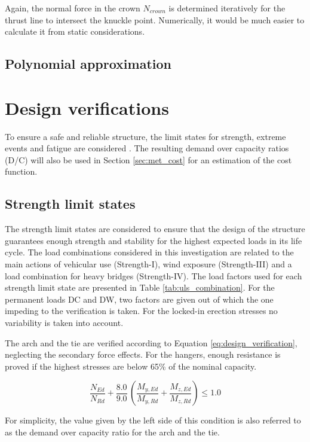 Again, the normal force in the crown $N_{crown}$ is determined iteratively for the thrust line to intersect the knuckle point. Numerically, it would be much easier to calculate it from static considerations.

\subsection{Polynomial approximation}

\newpage
\section{Design verifications} \label{sec:met_ver}
To ensure a safe and reliable structure, the limit states for strength, extreme events and fatigue are considered \cite{AASHTO}.  The resulting demand over capacity ratios (D/C) will also be used in Section \ref{sec:met_cost} for an estimation of the cost function.

\subsection{Strength limit states}
The strength limit states are considered to ensure that the design of the structure guarantees enough strength and stability for the highest expected loads in its life cycle. The load combinations considered in this investigation are related to the main actions of vehicular use (Strength-I), wind exposure (Strength-III) and a load combination for heavy bridges (Strength-IV). The load factors used for each strength limit state are presented in Table \ref{tab:uls_combination}. For the permanent loads DC and DW, two factors are given out of which the one impeding to the verification is taken. For the locked-in erection stresses no variability is taken into account.



The arch and the tie are verified according to Equation \eqref{eq:design_verification}, neglecting the secondary force effects. For the hangers, enough resistance is proved if the highest stresses are below 65\% of the nominal capacity. 

\begin{equation}
    \frac{N_{Ed}}{N_{Rd}} + \frac{8.0}{9.0}\, \left(\frac{M_{y,Ed}}{M_{y,Rd}}+\frac{M_{z,Ed}}{M_{z,Rd}} \right) \leq 1.0
    \label{eq:design_verification}
\end{equation}

For simplicity, the value given by the left side of this condition is also referred to as the demand over capacity ratio for the arch and the tie.

